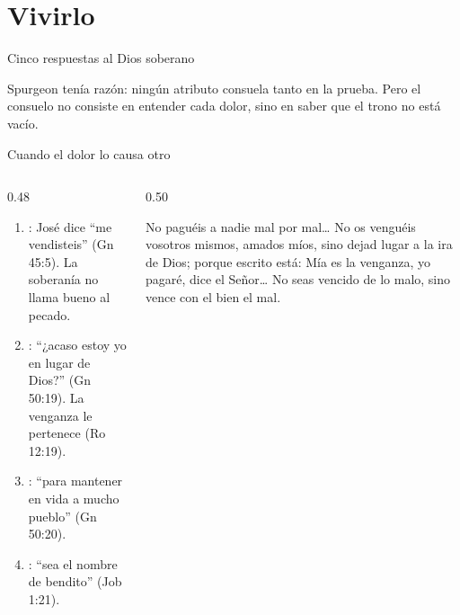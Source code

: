 \section{Vivirlo}

\begin{frame}{Cinco respuestas al Dios soberano}
\centering
{}\par\medskip
\small\RaggedRight Spurgeon tenía razón: ningún atributo consuela tanto en la prueba. Pero el consuelo no consiste en entender cada dolor, sino en saber que el trono no está vacío.
\end{frame}

\begin{frame}{Cuando el dolor lo causa otro}
\begin{columns}[t,onlytextwidth]
\begin{column}{0.48\textwidth}\small
\begin{enumerate}
\item {}: José dice ``me vendisteis'' (Gn 45:5). La soberanía no llama bueno al pecado.
\item {}: ``¿acaso estoy yo en lugar de Dios?'' (Gn 50:19). La venganza le pertenece (Ro 12:19).
\item {}: ``para mantener en vida a mucho pueblo'' (Gn 50:20).
\item {}: ``sea el nombre de \SENOR{} bendito'' (Job 1:21).
\end{enumerate}
\end{column}
\begin{column}{0.50\textwidth}
\begin{cita}No paguéis a nadie mal por mal\ldots{} No os venguéis vosotros mismos, amados míos, sino dejad lugar a la ira de Dios; porque escrito está: Mía es la venganza, yo pagaré, dice el Señor\ldots{} No seas vencido de lo malo, sino vence con el bien el mal.\end{cita}
\end{column}
\end{columns}
\end{frame}

